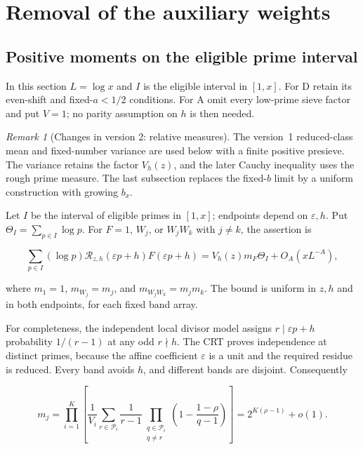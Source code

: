 \documentclass[11pt]{article}
\theoremstyle{definition}
\theoremstyle{remark}
\newtheorem{remark}[theorem]{Remark}
\numberwithin{equation}{section}
\begin{document}
\section{Removal of the auxiliary weights}\label{sec:weights}
\subsection{Positive moments on the eligible prime interval}\label{subsec:relative-moments}
In this section $L=\log x$ and $I$ is the eligible interval in
$[1,x]$. For D retain its even-shift and fixed-$a<1/2$ conditions.
For A omit every low-prime sieve factor and put $V=1$; no parity
assumption on $h$ is then needed.
\begin{remark}[Changes in version 2: relative measures]
The version~1 reduced-class mean and fixed-number variance are
used below with a finite positive presieve. The variance retains
the factor $V_h(z)$, and the later Cauchy inequality uses the rough
prime measure. The last subsection replaces the fixed-$b$ limit
by a uniform construction with growing $b_x$.
\end{remark}
Let $I$ be the interval of eligible primes in $[1,x]$; endpoints depend on $\varepsilon,h$. Put $\Theta_I=\sum_{p\in I}\log p$. For $F=1$, $W_j$, or $W_jW_k$ with $j\ne k$, the assertion is


\begin{equation}\label{v2:6-9}
\sum_{p\in I}(\log p)\mathcal R_{z,h}(\varepsilon p+h)F(\varepsilon p+h)
=V_h(z)m_F\Theta_I+O_A(xL^{-A}),
\end{equation}


where $m_1=1$, $m_{W_j}=m_j$, and $m_{W_jW_k}=m_jm_k$. The bound is uniform in $z,h$ and in both endpoints, for each fixed band array.

For completeness, the independent local divisor model assigns $r\mid\varepsilon p+h$ probability $1/(r-1)$ at any odd $r\nmid h$. The CRT proves independence at distinct primes, because the affine coefficient $\varepsilon$ is a unit and the required residue is reduced. Every band avoids $h$, and different bands are disjoint. Consequently


\begin{equation}\label{v2:6-10}
m_j=\prod_{i=1}^K\left[\frac1{V_i}\sum_{r\in\mathcal P_i}\frac1{r-1}
\prod_{\substack{q\in\mathcal P_i\\q\ne r}}
\left(1-\frac{1-\rho}{q-1}\right)\right]
=2^{K(\rho-1)}+o(1).
\end{equation}
\end{document}
